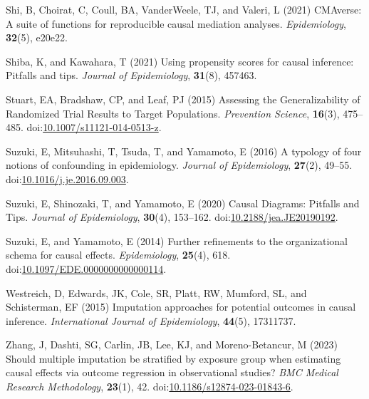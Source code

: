 \documentclass[
  singlecolumn,
  9pt]{article}
\newlength{\cslhangindent}
\newenvironment{CSLReferences}[2] %
 {\begin{list}{}{%
  \setlength{\itemindent}{0pt}
  \setlength{\leftmargin}{0pt}
  \setlength{\parsep}{0pt}
  \ifodd #1
   \setlength{\leftmargin}{\cslhangindent}
   \setlength{\itemindent}{-1\cslhangindent}
  \fi
  \setlength{\itemsep}{#2\baselineskip}}}
 {\end{list}}
\begin{document}
\begin{CSLReferences}{1}{0}
Shi, B, Choirat, C, Coull, BA, VanderWeele, TJ, and Valeri, L (2021)
CMAverse: A suite of functions for reproducible causal mediation
analyses. \emph{Epidemiology}, \textbf{32}(5), e20e22.

Shiba, K, and Kawahara, T (2021) Using propensity scores for causal
inference: Pitfalls and tips. \emph{Journal of Epidemiology},
\textbf{31}(8), 457463.

Stuart, EA, Bradshaw, CP, and Leaf, PJ (2015) Assessing the
Generalizability of Randomized Trial Results to Target Populations.
\emph{Prevention Science}, \textbf{16}(3), 475--485.
doi:\href{https://doi.org/10.1007/s11121-014-0513-z}{10.1007/s11121-014-0513-z}.

Suzuki, E, Mitsuhashi, T, Tsuda, T, and Yamamoto, E (2016) A typology of
four notions of confounding in epidemiology. \emph{Journal of
Epidemiology}, \textbf{27}(2), 49--55.
doi:\href{https://doi.org/10.1016/j.je.2016.09.003}{10.1016/j.je.2016.09.003}.

Suzuki, E, Shinozaki, T, and Yamamoto, E (2020) Causal Diagrams:
Pitfalls and Tips. \emph{Journal of Epidemiology}, \textbf{30}(4),
153--162.
doi:\href{https://doi.org/10.2188/jea.JE20190192}{10.2188/jea.JE20190192}.

Suzuki, E, and Yamamoto, E (2014) Further refinements to the
organizational schema for causal effects. \emph{Epidemiology},
\textbf{25}(4), 618.
doi:\href{https://doi.org/10.1097/EDE.0000000000000114}{10.1097/EDE.0000000000000114}.

Westreich, D, Edwards, JK, Cole, SR, Platt, RW, Mumford, SL, and
Schisterman, EF (2015) Imputation approaches for potential outcomes in
causal inference. \emph{International Journal of Epidemiology},
\textbf{44}(5), 17311737.

Zhang, J, Dashti, SG, Carlin, JB, Lee, KJ, and Moreno-Betancur, M (2023)
Should multiple imputation be stratified by exposure group when
estimating causal effects via outcome regression in observational
studies? \emph{BMC Medical Research Methodology}, \textbf{23}(1), 42.
doi:\href{https://doi.org/10.1186/s12874-023-01843-6}{10.1186/s12874-023-01843-6}.

\end{CSLReferences}
\end{document}
